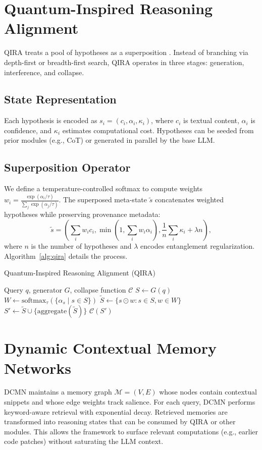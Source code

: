 \documentclass[11pt]{article}
\begin{document}
\section{Quantum-Inspired Reasoning Alignment}
\label{sec:qira}
QIRA treats a pool of hypotheses as a superposition \citep{yao2023tree}.  Instead of branching via depth-first or breadth-first search, QIRA operates in three stages: generation, interference, and collapse.

\subsection{State Representation}
Each hypothesis is encoded as $s_i = (c_i, \alpha_i, \kappa_i)$, where $c_i$ is textual content, $\alpha_i$ is confidence, and $\kappa_i$ estimates computational cost.  Hypotheses can be seeded from prior modules (e.g., CoT) or generated in parallel by the base LLM.

\subsection{Superposition Operator}
We define a temperature-controlled softmax to compute weights $w_i = \frac{\exp(\alpha_i/\tau)}{\sum_j \exp(\alpha_j/\tau)}$.  The superposed meta-state $\tilde{s}$ concatenates weighted hypotheses while preserving provenance metadata:
\begin{equation}
\tilde{s} = \left(\sum_i w_i c_i, \min\left(1, \sum_i w_i\alpha_i\right), \frac{1}{n}\sum_i \kappa_i + \lambda n \right),
\end{equation}
where $n$ is the number of hypotheses and $\lambda$ encodes entanglement regularization.  Algorithm~\ref{alg:qira} details the process.

\begin{algorithm}[t]
\caption{Quantum-Inspired Reasoning Alignment (QIRA)}
\label{alg:qira}
\begin{algorithmic}[1]
\Require Query $q$, generator $G$, collapse function $\mathcal{C}$
\State $S \leftarrow G(q)$ 
\State $W \leftarrow \text{softmax}_\tau(\{\alpha_s \mid s \in S\})$
\State $\tilde{S} \leftarrow \{ s \odot w : s \in S, w \in W \}$
\State $S' \leftarrow \tilde{S} \cup \{\text{aggregate}(\tilde{S})\}$
\State \Return $\mathcal{C}(S')$ 
\end{algorithmic}
\end{algorithm}

\section{Dynamic Contextual Memory Networks}
\label{sec:dcmn}
DCMN maintains a memory graph $\mathcal{M} = (V, E)$ whose nodes contain contextual snippets and whose edge weights track salience.  For each query, DCMN performs keyword-aware retrieval with exponential decay.  Retrieved memories are transformed into reasoning states that can be consumed by QIRA or other modules.  This allows the framework to surface relevant computations (e.g., earlier code patches) without saturating the LLM context.
\end{document}
